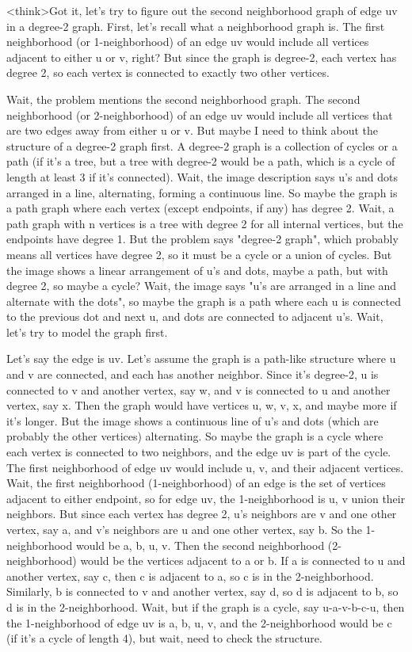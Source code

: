 <think>Got it, let's try to figure out the second neighborhood graph of edge uv in a degree-2 graph. First, let's recall what a neighborhood graph is. The first neighborhood (or 1-neighborhood) of an edge uv would include all vertices adjacent to either u or v, right? But since the graph is degree-2, each vertex has degree 2, so each vertex is connected to exactly two other vertices. 

Wait, the problem mentions the second neighborhood graph. The second neighborhood (or 2-neighborhood) of an edge uv would include all vertices that are two edges away from either u or v. But maybe I need to think about the structure of a degree-2 graph first. A degree-2 graph is a collection of cycles or a path (if it's a tree, but a tree with degree-2 would be a path, which is a cycle of length at least 3 if it's connected). Wait, the image description says u's and dots arranged in a line, alternating, forming a continuous line. So maybe the graph is a path graph where each vertex (except endpoints, if any) has degree 2. Wait, a path graph with n vertices is a tree with degree 2 for all internal vertices, but the endpoints have degree 1. But the problem says "degree-2 graph", which probably means all vertices have degree 2, so it must be a cycle or a union of cycles. But the image shows a linear arrangement of u's and dots, maybe a path, but with degree 2, so maybe a cycle? Wait, the image says "u's are arranged in a line and alternate with the dots", so maybe the graph is a path where each u is connected to the previous dot and next u, and dots are connected to adjacent u's. Wait, let's try to model the graph first.

Let's say the edge is uv. Let's assume the graph is a path-like structure where u and v are connected, and each has another neighbor. Since it's degree-2, u is connected to v and another vertex, say w, and v is connected to u and another vertex, say x. Then the graph would have vertices u, w, v, x, and maybe more if it's longer. But the image shows a continuous line of u's and dots (which are probably the other vertices) alternating. So maybe the graph is a cycle where each vertex is connected to two neighbors, and the edge uv is part of the cycle. The first neighborhood of edge uv would include u, v, and their adjacent vertices. Wait, the first neighborhood (1-neighborhood) of an edge is the set of vertices adjacent to either endpoint, so for edge uv, the 1-neighborhood is {u, v} union their neighbors. But since each vertex has degree 2, u's neighbors are v and one other vertex, say a, and v's neighbors are u and one other vertex, say b. So the 1-neighborhood would be {a, b, u, v}. Then the second neighborhood (2-neighborhood) would be the vertices adjacent to a or b. If a is connected to u and another vertex, say c, then c is adjacent to a, so c is in the 2-neighborhood. Similarly, b is connected to v and another vertex, say d, so d is adjacent to b, so d is in the 2-neighborhood. Wait, but if the graph is a cycle, say u-a-v-b-c-u, then the 1-neighborhood of edge uv is {a, b, u, v}, and the 2-neighborhood would be {c} (if it's a cycle of length 4), but wait, need to check the structure.

